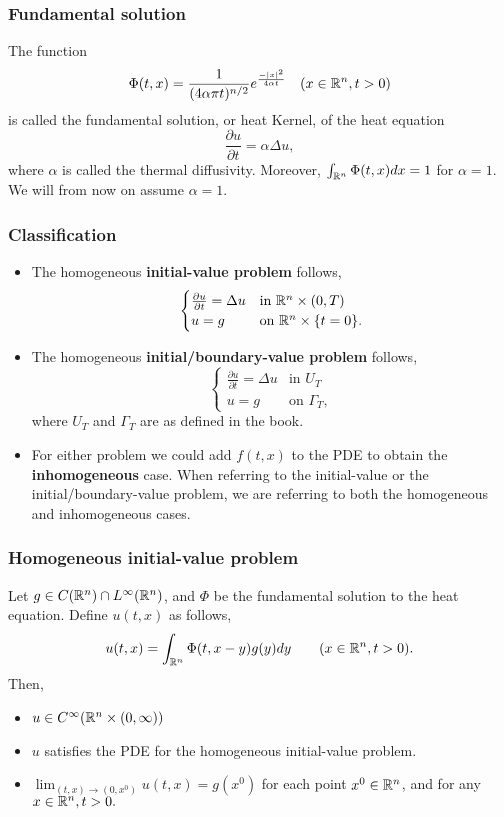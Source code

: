 \documentclass[oneside,a4paper,11pt]{report}
\begin{document}
\subsubsection{Fundamental solution}
The function
\[ \Phi(t,x) = \frac{1}{(4\alpha \pi t)^{n/2}} e^{\frac{-|x|^2}{4\alpha t}} \quad (x \in {\mathbb{R}^n}, t > 0) \]
is called the fundamental solution, or heat Kernel, of the heat equation
\[ \frac{\partial u}{\partial t} = \alpha \Delta u, \]
where $\alpha$ is called the thermal diffusivity. Moreover, $\int_{{\mathbb{R}^n}} \Phi(t,x) dx = 1 $ for $\alpha=1$. We will from now on assume $\alpha = 1$.

\subsubsection{Classification}
\begin{itemize}

\item The homogeneous \textbf{initial-value problem} follows,
\[\begin{cases}
\frac{\partial u}{\partial t} = \Delta u & \text{in } {\mathbb{R}^n} \times (0,T)\\
u = g & \text{on } {\mathbb{R}^n} \times \{t=0\}.
\end{cases} \]

\item The homogeneous \textbf{initial/boundary-value problem} follows,
\[\begin{cases}
\frac{\partial u}{\partial t} = \Delta u & \text{in } U_T\\
u = g & \text{on } \Gamma_T,
\end{cases} \]
where $U_T$ and $\Gamma_T$ are as defined in the book.

\item For either problem we could add $f(t,x)$ to the PDE to obtain the \textbf{inhomogeneous} case. When referring to the initial-value or the initial/boundary-value problem, we are referring to both the homogeneous and inhomogeneous cases.
\end{itemize}
 
\subsubsection{Homogeneous initial-value problem} Let $g \in C({\mathbb{R}^n})\cap L^\infty({\mathbb{R}^n})$, and $\Phi$ be the fundamental solution to the heat equation. Define $u(t,x)$ as follows,
\[u(t,x) = \int_{{\mathbb{R}^n}}\Phi(t,x-y)g(y)dy \qquad (x \in {\mathbb{R}^n}, t > 0). \]
Then,
\begin{itemize}
\item $u \in C^\infty({\mathbb{R}^n} \times (0,\infty))$
\item $u$ satisfies the PDE for the homogeneous initial-value problem.
\item $\lim_{(t,x) \to (0,x^0)} u(t,x) = g(x^0)$ for each point $x^0 \in {\mathbb{R}^n}$, and for any $x\in {\mathbb{R}^n}, t > 0.$
\end{itemize}
\end{document}
